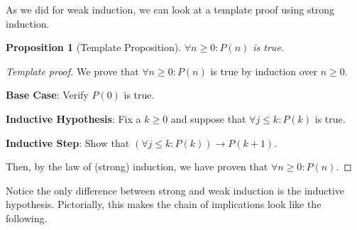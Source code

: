 \documentclass{article}
\newcommand{\ra}{\rightarrow}
\theoremstyle{plain}
\newtheorem*{proposition*}{Proposition}
\theoremstyle{definition}
\begin{document}
As we did for weak induction, we can look at a template proof using strong induction.

\begin{proposition*}[Template Proposition]
    \(\forall n \geq 0 : P(n)\) is true.
\end{proposition*}
\begin{proof}[Template proof]
    We prove that \(\forall n \geq 0 : P(n)\) is true by induction over \(n \geq 0\).
    
    \textbf{Base Case}: Verify \(P(0)\) is true.

    \textbf{Inductive Hypothesis}: Fix a \(k \geq 0\) and suppose that \(\forall j \leq k: P(k)\) is true.

    \textbf{Inductive Step}: Show that \(\left(\forall j \leq k: P(k)\right) \ra P(k+1)\).

    Then, by the law of (strong) induction, we have proven that \(\forall n \geq 0 : P(n)\).
\end{proof}

Notice the only difference between strong and weak induction is the inductive hypothesis. Pictorially, this makes the chain of implications look like the following.
\end{document}
